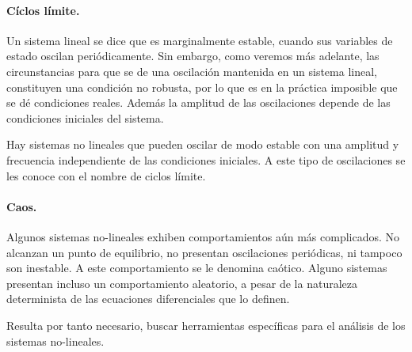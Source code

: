 \paragraph{Cíclos límite.} Un sistema lineal se dice que es marginalmente estable, cuando sus variables de estado oscilan periódicamente. Sin embargo, como veremos más adelante, las circunstancias para que se de una oscilación mantenida en un sistema lineal, constituyen una condición no robusta, por lo que es en la práctica  imposible que se dé  condiciones reales. Además la amplitud de las oscilaciones depende de las condiciones iniciales del sistema.

Hay sistemas no lineales que pueden oscilar de modo estable con una amplitud y frecuencia independiente de las condiciones iniciales. A este tipo de oscilaciones se les conoce con el nombre de ciclos límite. 

\paragraph{Caos.} Algunos sistemas no-lineales exhiben comportamientos aún más complicados. No alcanzan un punto de equilibrio, no presentan oscilaciones periódicas, ni tampoco son inestable. A este comportamiento se le denomina caótico. Alguno sistemas presentan incluso un comportamiento aleatorio, a pesar de la naturaleza determinista de las ecuaciones diferenciales que lo definen.


 Resulta por tanto necesario, buscar herramientas específicas para el análisis de los sistemas no-lineales.
